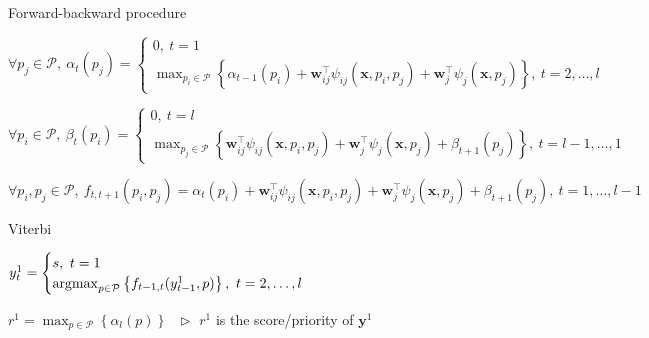 \begin{algorithm}[htbp]
\caption{Forward-backward procedure~\cite{rabiner1989tutorial}}
\label{alg:forward-backward}
\begin{algorithmic}[1]
  \STATE $\forall p_j \in \mathcal{P},~ \alpha_t(p_j) =
          \begin{cases}
          0,~ t = 1 \\
          \max_{p_i \in \mathcal{P}} \left\{ \alpha_{t-1}(p_i) + \mathbf{w}_{ij}^\top \psi_{ij}(\mathbf{x}, p_i, p_j) +
          \mathbf{w}_j^\top \psi_j(\mathbf{x}, p_j) \right\},~ t=2,\dots,l
          \end{cases}$

  \STATE $\forall p_i \in \mathcal{P},~ \beta_t(p_i) =
          \begin{cases}
          0,~ t = l \\
          \max_{p_j \in \mathcal{P}} \left\{ \mathbf{w}_{ij}^\top \psi_{ij}(\mathbf{x}, p_i, p_j) +
          \mathbf{w}_j^\top \psi_j(\mathbf{x}, p_j) + \beta_{t+1}(p_j) \right\},~ t = l-1,\dots,1
          \end{cases}$

  \STATE $\forall p_i, p_j \in \mathcal{P},~ f_{t,t+1}(p_i, p_j) = \alpha_t(p_i) + \mathbf{w}_{ij}^\top \psi_{ij}(\mathbf{x}, p_i, p_j) +
                                \mathbf{w}_j^\top \psi_j(\mathbf{x}, p_j) + \beta_{t+1}(p_j),~ t = 1,\dots,l-1$
\end{algorithmic}
\end{algorithm}

\begin{algorithm}[htbp]
\caption{Viterbi}
\label{alg:viterbi}
\begin{algorithmic}[1]
  \STATE $y_t^1 = \begin{cases}
                  s,~ t = 1 \\
                  \operatorname*{argmax}_{p \in \mathcal{P}} \left\{ f_{t-1,t}(y_{t-1}^1, p) \right\},~ t = 2,\dots,l
                  \end{cases}$

  \STATE $r^1 = \max_{p \in \mathcal{P}} \left\{ \alpha_{l}(p) \right\}~~~ \triangleright$ $r^1$ is the score/priority of $\mathbf{y}^1$
\end{algorithmic}
\end{algorithm}


